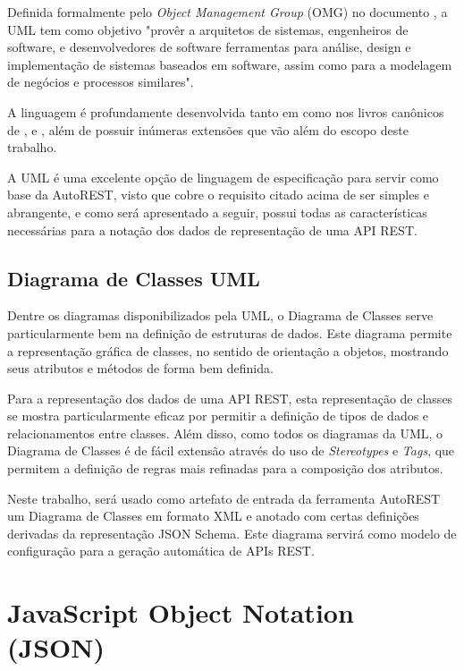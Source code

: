 Definida formalmente pelo \textit{Object Management Group} (OMG) no documento \cite{OMG:2011}, a UML tem como objetivo "provêr a arquitetos de sistemas, engenheiros de software, e desenvolvedores de software ferramentas para análise, design e implementação de sistemas baseados em software, assim como para a modelagem de negócios e processos similares".

A linguagem é profundamente desenvolvida tanto em \cite{OMG:2011} como nos livros canônicos de ,  e , além de possuir inúmeras extensões que vão além do escopo deste trabalho.

A UML é uma excelente opção de linguagem de especificação para servir como base da AutoREST, visto que cobre o requisito citado acima de ser simples e abrangente, e como será apresentado a seguir, possui todas as características necessárias para a notação dos dados de representação de uma API REST.


\subsection{Diagrama de Classes UML}

Dentre os diagramas disponibilizados pela UML, o Diagrama de Classes serve particularmente bem na definição de estruturas de dados. Este diagrama permite a representação gráfica de classes, no sentido de orientação a objetos, mostrando seus atributos e métodos de forma bem definida.

Para a representação dos dados de uma API REST, esta representação de classes se mostra particularmente eficaz por permitir a definição de tipos de dados e relacionamentos entre classes. Além disso, como todos os diagramas da UML, o Diagrama de Classes é de fácil extensão através do uso de \textit{Stereotypes} e \textit{Tags}, que permitem a definição de regras mais refinadas para a composição dos atributos.

Neste trabalho, será usado como artefato de entrada da ferramenta AutoREST um Diagrama de Classes em formato XML e anotado com certas definições derivadas da representação JSON Schema. Este diagrama servirá como modelo de configuração para a geração automática de APIs REST.


\section{JavaScript Object Notation (JSON)}

